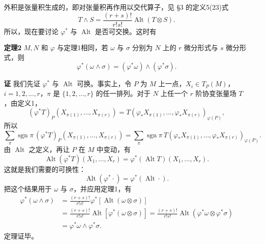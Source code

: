 外积是张量积生成的，即对张量积再作用以交代算子，见 §3 的定义5(23)式
\[
 T\wedge S=\frac{(r+s)!}{r!s!}\operatorname{Alt}(T\otimes S).
\]
所以，现在要讨论 $\varphi^*$ 与 $\operatorname{Alt}$ 是否可交换。这时有

\noindent\textbf{定理2}
$M,N$ 和 $\varphi$ 与定理1相同，若 $\omega$ 与 $\sigma$ 分别为 $N$ 上的 $r$ 微分形式与 $s$ 微分形式，则
\begin{equation}
 \varphi^*(\omega\wedge\sigma)=(\varphi^*\omega)\wedge(\varphi^*\sigma).
 \tag{10}
\end{equation}

\noindent\textbf{证}
我们先证 $\varphi^*$ 与 $\operatorname{Alt}$ 可换。事实上，令 $P$ 为 $M$ 上一点，$X_i\in T_P(M)$，$i=1,2,\ldots,r$，$\pi$ 是 $\{1,2,\ldots,r\}$ 的任一排列。对于 $N$ 上任一个 $r$ 阶协变张量场 $T$，由定义1，
\[
 (\varphi^*T)_P(X_{\pi(1)},\ldots,X_{\pi(r)})
 =T(\varphi_*X_{\pi(1)},\ldots,\varphi_*X_{\pi(r)})_{\varphi(P)},
\]
所以
\[
 \sum_\pi\operatorname{sgn}\pi\,(\varphi^*T)_P(X_{\pi(1)},\ldots,X_{\pi(r)})
 =\sum_\pi\operatorname{sgn}\pi\,T(\varphi_*X_{\pi(1)},\ldots,\varphi_*X_{\pi(r)})_{\varphi(P)}.
\]
由 $\operatorname{Alt}$ 之定义，再让 $P$ 在 $M$ 中变动，有
\[
 \operatorname{Alt}(\varphi^*T)(X_1,\ldots,X_r)=\varphi^*(\operatorname{Alt}T)(X_1,\ldots,X_r).
\]
这就是我们需要的可换性：
\begin{equation}
 \operatorname{Alt}(\varphi^*\cdot)=\varphi^*(\operatorname{Alt}\cdot).
 \tag{11}
\end{equation}
把这个结果用于 $\omega$ 与 $\sigma$，并应用定理1，有
\begin{align*}
 \varphi^*(\omega\wedge\sigma)
 &=\frac{(r+s)!}{r!s!}\varphi^*[\operatorname{Alt}(\omega\otimes\sigma)]\\
 &=\frac{(r+s)!}{r!s!}\operatorname{Alt}[\varphi^*(\omega\otimes\sigma)]
 =\frac{(r+s)!}{r!s!}\operatorname{Alt}(\varphi^*\omega\otimes\varphi^*\sigma)\\
 &=\varphi^*\omega\wedge\varphi^*\sigma.
\end{align*}
定理证毕。

